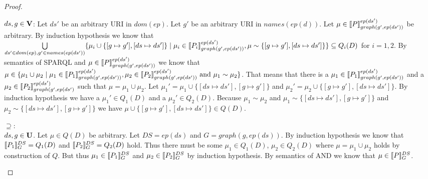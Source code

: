 \begin{proof}
\begin{enumerate}
			\bigskip\noindent
			$ds,g \in \mathbf{V}$:
			Let $ds'$ be an arbitrary URI in $dom(ep)$.
			Let $g'$ be an arbitrary URI in $names(ep(d))$.
			Let $\mu \in \llbracket P \rrbracket^{ep(ds')}_{graph(g',ep(ds'))}$ be arbitrary. 
			By induction hypothesis we know that
			$\bigcup\limits\limits_{ds'\in dom(ep),g' \in names(ep(ds'))}\{\mu_i \cup \{[g \mapsto g'
				],[ds \mapsto ds']\} \mid 
				\mu_i \in \llbracket P_i \rrbracket^{ep(ds')}_{graph(g',ep(ds'))}, \mu
			\sim \{[g \mapsto g'], [ds\mapsto ds']\}\} \subseteq Q_i(D)$
			for $i = 1,2$.
			By semantics of SPARQL and $\mu \in \llbracket P \rrbracket^{ep(ds')}_{graph(g',ep(ds'))}$ we know that 
			$\mu \in \{\mu_1 \cup \mu_2 \mid \mu_1 \in \llbracket P_1
				\rrbracket^{ep(ds')}_{graph(g',ep(ds'))}, \mu_2 \in \llbracket
			P_2 \rrbracket^{ep(ds')}_{graph(g',ep(ds'))}\\ \mbox{ and }  \mu_1 \sim \mu_2\}$. 
			That means that there is a $\mu_1 \in \llbracket P_1 \rrbracket_{graph(g',ep(ds'))}^{ep(ds')}$ 
			and a $\mu_2 \in \llbracket P_2 \rrbracket^{ep(ds')}_{graph(g',ep(ds')}$ such that 
			$\mu = \mu_1 \cup \mu_2$.
			 Let $\mu_1' = \mu_1\cup\{[ds\mapsto ds'],[g\mapsto g']\}$ and
			$\mu_2' = \mu_2\cup\{[g\mapsto g'],[ds\mapsto ds']\}$.
			By induction hypothesis we have a $\mu_1' \in Q_1(D)$ and a $\mu_2' \in
			Q_2(D)$.
			Because $\mu_1 \sim \mu_2$ and $\mu_1 \sim \{[ds \mapsto ds'],[g\mapsto g']\}$ and
			$\mu_2 \sim\{[ds \mapsto ds'], [g
			\mapsto g']\}$ we have $\mu \cup \{[g\mapsto g'], [ds \mapsto ds']\} \in Q(D)$.

			\bigskip
			\noindent$\supseteq:$\\
			$ds,g \in \mathbf{U}$.
			Let $\mu \in Q(D)$ be arbitrary. Let $DS = ep(ds)$ and $G = graph(g,ep(ds))$.
			By induction hypothesis we know that $\llbracket P_1 \rrbracket^{DS}_{G} = Q_1(D)$ and
			$\llbracket P_2 \rrbracket^{DS}_{G} = Q_2(D)$ hold. 
			Thus there must be some $\mu_1 \in Q_1(D)$, $\mu_2 \in Q_2(D)$ 
			where $\mu= \mu_1 \cup \mu_2$ holds by construction of $Q$.
			But thus $\mu_1 \in \llbracket P_1 \rrbracket^{DS}_{G}$ and $\mu_2 \in \llbracket
			P_2\rrbracket^{DS}_{G}$ by induction hypothesis. 
			By semantics of AND we know that $\mu \in \llbracket P \rrbracket^{DS}_{G}$.


\end{enumerate}
\end{proof}

